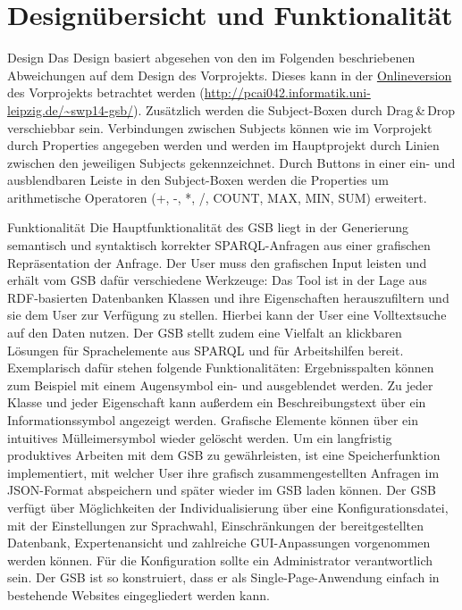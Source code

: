 \section{Designübersicht und Funktionalität}
Design
Das Design basiert abgesehen von den im Folgenden beschriebenen
Abweichungen auf dem Design des Vorprojekts. Dieses kann in der
\href{}{Onlineversion} des Vorprojekts betrachtet werden (\url{http://pcai042.informatik.uni-leipzig.de/~swp14-gsb/}).
Zusätzlich werden die Subject-Boxen durch Drag\,\&\,Drop verschiebbar sein. Verbindungen zwischen Subjects können wie im Vorprojekt durch Properties angegeben werden und werden im Hauptprojekt durch Linien zwischen den jeweiligen Subjects gekennzeichnet.
Durch Buttons in einer ein- und ausblendbaren Leiste in den Subject-Boxen werden die Properties um arithmetische Operatoren (+, -, *, /, COUNT, MAX, MIN, SUM) erweitert.

Funktionalität
Die Hauptfunktionalität des GSB liegt in der Generierung semantisch und syntaktisch korrekter SPARQL-Anfragen aus einer grafischen Repräsentation der Anfrage. Der User muss den grafischen Input leisten und erhält vom GSB dafür verschiedene Werkzeuge:
Das Tool ist in der Lage aus RDF-basierten Datenbanken Klassen und ihre Eigenschaften herauszufiltern und sie dem User zur Verfügung zu stellen. Hierbei kann der User eine Volltextsuche auf den Daten nutzen. Der GSB stellt zudem eine Vielfalt an klickbaren Lösungen für Sprachelemente aus SPARQL und für Arbeitshilfen bereit. Exemplarisch dafür stehen folgende Funktionalitäten: Ergebnisspalten können zum Beispiel mit einem Augensymbol ein- und ausgeblendet werden. Zu jeder Klasse und jeder Eigenschaft kann außerdem ein Beschreibungstext über ein Informationssymbol angezeigt werden. Grafische Elemente können über ein intuitives Mülleimersymbol wieder gelöscht werden.
Um ein langfristig produktives Arbeiten mit dem GSB zu gewährleisten, ist eine Speicherfunktion implementiert, mit welcher User ihre grafisch zusammengestellten Anfragen im JSON-Format abspeichern und später wieder im GSB laden können. 
Der GSB verfügt über Möglichkeiten der Individualisierung über eine Konfigurationsdatei, mit der Einstellungen zur Sprachwahl, Einschränkungen der bereitgestellten Datenbank, Expertenansicht und zahlreiche GUI-Anpassungen vorgenommen werden können. Für die Konfiguration sollte ein Administrator verantwortlich sein.
Der GSB ist so konstruiert, dass er als Single-Page-Anwendung einfach
in bestehende Websites eingegliedert werden kann.


